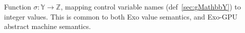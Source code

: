 

Function $\sigma: \mathbb{Y} \to \mathbb{Z}$, mapping control variable names (def~\ref{sec:gMathbbY}) to integer values.
This is common to both Exo value semantics, and Exo-GPU abstract machine semantics.

